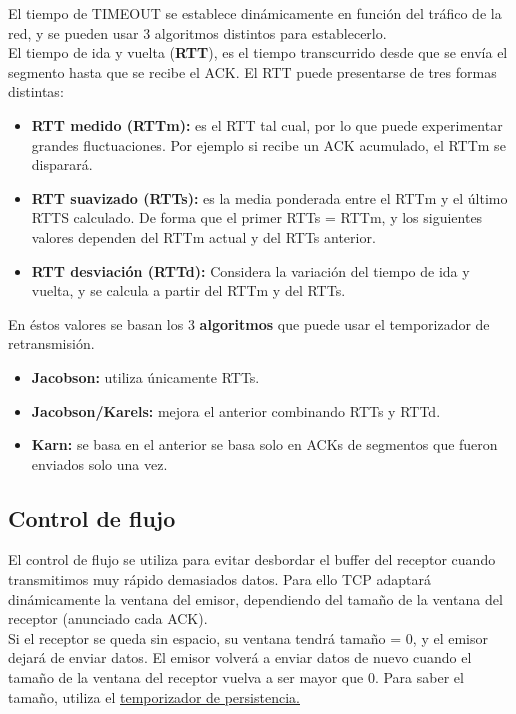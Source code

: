 \begin{onepage}
\begin{tcolorbox}[
title=Temporizador de retransmisión (TIMEOUT),
colback=cyan!5!white,
colframe=cyan!75!black,
fonttitle=\bfseries]
El tiempo de TIMEOUT se establece dinámicamente en función del tráfico de la red, y se pueden usar 3 algoritmos distintos para establecerlo.\\

El tiempo de ida y vuelta (\textbf{RTT}), es el tiempo transcurrido desde que se envía el
segmento hasta que se recibe el ACK. El RTT puede presentarse de tres formas distintas:
\begin{itemize}
    \item \textbf{RTT medido (RTTm): }es el RTT tal cual, por lo que puede experimentar grandes fluctuaciones. Por ejemplo si recibe un ACK acumulado, el RTTm se disparará.
    \item \textbf{RTT suavizado (RTTs): }es la media ponderada entre el RTTm y el último RTTS calculado. De forma que el primer RTTs = RTTm, y los siguientes valores dependen del RTTm actual y del RTTs anterior.
    \item \textbf{RTT desviación (RTTd): }Considera la variación del tiempo de ida y vuelta, y se calcula a partir del RTTm y del RTTs.
\end{itemize}

En éstos valores se basan los 3 \textbf{algoritmos} que puede usar el temporizador de retransmisión.
\begin{itemize}
    \item \textbf{Jacobson: }utiliza únicamente RTTs.
    \item \textbf{Jacobson/Karels: }mejora el anterior combinando RTTs y RTTd.
    \item \textbf{Karn: }se basa en el anterior se basa solo en ACKs de segmentos que fueron enviados solo una vez.
\end{itemize}
\end{tcolorbox}
\subsection{Control de flujo}
El control de flujo se utiliza para evitar desbordar el buffer del receptor cuando transmitimos muy rápido demasiados datos. Para ello TCP adaptará dinámicamente la ventana del emisor, dependiendo del tamaño de la ventana del receptor (anunciado cada ACK).\\

Si el receptor se queda sin espacio, su ventana tendrá tamaño = 0, y el emisor dejará de enviar datos. El emisor volverá a enviar datos de nuevo cuando el tamaño de la ventana del receptor vuelva a ser mayor que 0. Para saber el tamaño, utiliza el \underline{\hyperref[tempers]{temporizador de persistencia.}}

\end{onepage}
